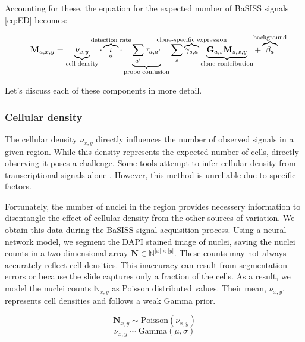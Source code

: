 Accounting for these, the equation for the expected number of BaSISS signals \cref{eq:ED} becomes:

\begin{equation} 
\mathbf{M}_{a, x,y} = \underbrace{\nu_{x,y}}_{\text{cell density}} \cdot \overbrace{\iota}_a^{\mathclap{\text{detection rate}}} \cdot \underbrace{\sum_{a'} \tau_{a,a'}}_{\text{probe confusion}} \sum_s  \overbrace{\gamma_{s,a}}^{\mathclap{\text{clone-specific expression}}} \underbrace{\mathbf{G}_{a,s} \mathbf{M}_{s,x,y}}_{\text{clone contribution}} + \overbrace{\beta_a}^{\mathclap{\text{background}}}
\label{eq:ED_full}\\
\end{equation} 

Let's discuss each of these components in more detail.

\subsubsection*{Cellular density}
The cellular density $\nu_{x,y}$ directly influences the number of observed signals in a given region. While this density represents the expected number of cells, directly observing it poses a challenge. Some tools attempt to infer cellular density from transcriptional signals alone \parencite{Kleshchevnikov2022-ub}. However, this method is unreliable due to  specific factors.

Fortunately, the number of nuclei in the region provides necessery information to disentangle the effect of cellular density from the other sources of variation. We obtain this data during the \ac{BaSISS} signal acquisition process. Using a neural network model, we segment the DAPI stained image of nuclei, saving the nuclei counts in a two-dimensional array $\mathbf{N} \in \mathbb{N}^{|x| \times |y|}$. These counts may not always accurately reflect cell densities. This inaccuracy can result from segmentation errors or because the slide captures only a fraction of the cells. As a result, we model the nuclei counts $\mathbb{N}_{x,y}$ as Poisson distributed values. Their mean, $\nu_{x,y}$, represents cell densities and follows a weak Gamma prior.

\begin{equation}
    \mathbf{N}_{x,y} \sim \text{Poisson}({\nu}_{x,y})
\end{equation}
\begin{equation}
    {\nu}_{x,y} \sim \text{Gamma}(\mu, \sigma)
\end{equation}

